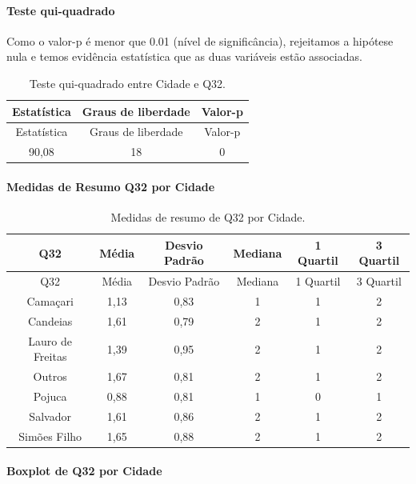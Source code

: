 \documentclass[]{article}
\let\oldparagraph\paragraph
\renewcommand{\paragraph}[1]{\oldparagraph{#1}\mbox{}}
\begin{document}
\hypertarget{teste-qui-quadrado-92}{%
\paragraph{Teste qui-quadrado}\label{teste-qui-quadrado-92}}

Como o valor-p é menor que 0.01 (nível de significância), rejeitamos a hipótese nula e temos evidência estatística que as duas variáveis estão associadas.

\begin{longtable}[]{@{}ccc@{}}
\caption{\label{tab:unnamed-chunk-1078}Teste qui-quadrado entre Cidade e Q32.}\tabularnewline
\toprule
Estatística & Graus de liberdade & Valor-p\tabularnewline
\midrule
\endfirsthead
\toprule
Estatística & Graus de liberdade & Valor-p\tabularnewline
\midrule
\endhead
90,08 & 18 & 0\tabularnewline
\bottomrule
\end{longtable}

\cleardoublepage

\hypertarget{medidas-de-resumo-q32-por-cidade}{%
\paragraph{Medidas de Resumo Q32 por Cidade}\label{medidas-de-resumo-q32-por-cidade}}

\begin{longtable}[]{@{}cccccc@{}}
\caption{\label{tab:unnamed-chunk-1079}Medidas de resumo de Q32 por Cidade.}\tabularnewline
\toprule
Q32 & Média & Desvio Padrão & Mediana & 1 Quartil & 3 Quartil\tabularnewline
\midrule
\endfirsthead
\toprule
Q32 & Média & Desvio Padrão & Mediana & 1 Quartil & 3 Quartil\tabularnewline
\midrule
\endhead
Camaçari & 1,13 & 0,83 & 1 & 1 & 2\tabularnewline
Candeias & 1,61 & 0,79 & 2 & 1 & 2\tabularnewline
Lauro de Freitas & 1,39 & 0,95 & 2 & 1 & 2\tabularnewline
Outros & 1,67 & 0,81 & 2 & 1 & 2\tabularnewline
Pojuca & 0,88 & 0,81 & 1 & 0 & 1\tabularnewline
Salvador & 1,61 & 0,86 & 2 & 1 & 2\tabularnewline
Simões Filho & 1,65 & 0,88 & 2 & 1 & 2\tabularnewline
\bottomrule
\end{longtable}

\hypertarget{boxplot-de-q32-por-cidade}{%
\paragraph{Boxplot de Q32 por Cidade}\label{boxplot-de-q32-por-cidade}}
\end{document}
